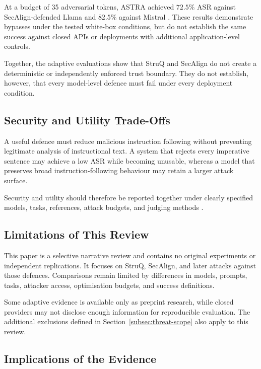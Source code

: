 At a budget of 35 adversarial tokens, ASTRA achieved \(72.5\%\) ASR against
SecAlign-defended Llama and \(82.5\%\) against Mistral
\parencite{pandya2025astra}. These results demonstrate bypasses under the tested
white-box conditions, but do not establish the same success against closed APIs
or deployments with additional application-level controls.

Together, the adaptive evaluations show that StruQ and SecAlign do not create a
deterministic or independently enforced trust boundary. They do not establish,
however, that every model-level defence must fail under every deployment
condition.

\subsection{Security and Utility Trade-Offs}
\label{subsec:security-utility}

A useful defence must reduce malicious instruction following without preventing
legitimate analysis of instructional text. A system that rejects every
imperative sentence may achieve a low ASR while becoming unusable, whereas a
model that preserves broad instruction-following behaviour may retain a larger
attack surface.

Security and utility should therefore be reported together under clearly
specified models, tasks, references, attack budgets, and judging methods
\parencites{chen2025struq}{chen2025secalign}{jia2025critical}.

\subsection{Limitations of This Review}
\label{subsec:review-limitations}

This paper is a selective narrative review and contains no original experiments
or independent replications. It focuses on StruQ, SecAlign, and later attacks
against those defences. Comparisons remain limited by differences in models,
prompts, tasks, attacker access, optimisation budgets, and success definitions.

Some adaptive evidence is available only as preprint research, while closed
providers may not disclose enough information for reproducible evaluation. The
additional exclusions defined in Section~\ref{subsec:threat-scope} also apply
to this review.

\subsection{Implications of the Evidence}
\label{subsec:open-problem}

